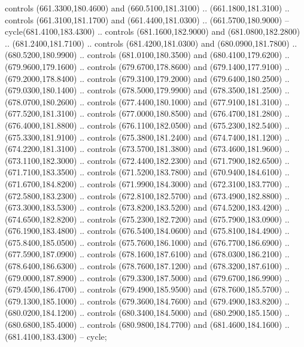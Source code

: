 {\begin{scope}[y=0.80pt, x=0.80pt, yscale=-1, xscale=1, inner sep=0pt, outer sep=0pt, #1]
      controls (661.3300,180.4600) and (660.5100,181.3100) .. (661.1800,181.3100) ..
      controls (661.3100,181.1700) and (661.4400,181.0300) .. (661.5700,180.9000) --
      cycle(681.4100,183.4300) .. controls (681.1600,182.9000) and
      (681.0800,182.2800) .. (681.2400,181.7100) .. controls (681.4200,181.0300) and
      (680.0900,181.7800) .. (680.5200,180.9900) .. controls (681.0100,180.3500) and
      (680.4100,179.6200) .. (679.9600,179.1600) .. controls (679.6700,178.8600) and
      (679.1400,177.9100) .. (679.2000,178.8400) .. controls (679.3100,179.2000) and
      (679.6400,180.2500) .. (679.0300,180.1400) .. controls (678.5000,179.9900) and
      (678.3500,181.2500) .. (678.0700,180.2600) .. controls (677.4400,180.1000) and
      (677.9100,181.3100) .. (677.5200,181.3100) .. controls (677.0000,180.8500) and
      (676.4700,181.2800) .. (676.4000,181.8800) .. controls (676.1100,182.0500) and
      (675.2300,182.5400) .. (675.3300,181.9100) .. controls (675.3800,181.2400) and
      (674.7400,181.1200) .. (674.2200,181.3100) .. controls (673.5700,181.3800) and
      (673.4600,181.9600) .. (673.1100,182.3000) .. controls (672.4400,182.2300) and
      (671.7900,182.6500) .. (671.7100,183.3500) .. controls (671.5200,183.7800) and
      (670.9400,184.6100) .. (671.6700,184.8200) .. controls (671.9900,184.3000) and
      (672.3100,183.7700) .. (672.5800,183.2300) .. controls (672.8100,182.5700) and
      (673.4900,182.8800) .. (673.3000,183.5300) .. controls (673.8200,183.5200) and
      (674.5200,183.4200) .. (674.6500,182.8200) .. controls (675.2300,182.7200) and
      (675.7900,183.0900) .. (676.1900,183.4800) .. controls (676.5400,184.0600) and
      (675.8100,184.4900) .. (675.8400,185.0500) .. controls (675.7600,186.1000) and
      (676.7700,186.6900) .. (677.5900,187.0900) .. controls (678.1600,187.6100) and
      (678.0300,186.2100) .. (678.6400,186.6300) .. controls (678.7600,187.1200) and
      (678.3200,187.6100) .. (679.0000,187.8900) .. controls (679.3300,187.5000) and
      (679.6700,186.9900) .. (679.4500,186.4700) .. controls (679.4900,185.9500) and
      (678.7600,185.5700) .. (679.1300,185.1000) .. controls (679.3600,184.7600) and
      (679.4900,183.8200) .. (680.0200,184.1200) .. controls (680.3400,184.5000) and
      (680.2900,185.1500) .. (680.6800,185.4000) .. controls (680.9800,184.7700) and
      (681.4600,184.1600) .. (681.4100,183.4300) -- cycle;


\end{scope}}
